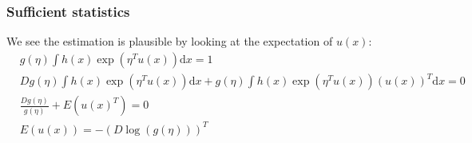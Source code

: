 \documentclass{beamer}
\begin{document}
\begin{frame}
    \frametitle{Sufficient statistics}
    We see the estimation is plausible by looking at the expectation of $u(x)$:
    \begin{align*}
        &g(\eta)\int{}h(x)\exp(\eta^{T}u(x))\mathrm{d}x=1 \\
        &Dg(\eta)\int{}h(x)\exp(\eta^{T}u(x))\mathrm{d}x+g(\eta)\int{}h(x)\exp(\eta^{T}u(x))(u(x))^{T}\mathrm{d}x=0 \\
        &\frac{Dg(\eta)}{g(\eta)}+E(u(x)^{T})=0 \\
        &E(u(x))=-(D\log(g(\eta)))^{T}
    \end{align*}
\end{frame}
\end{document}

